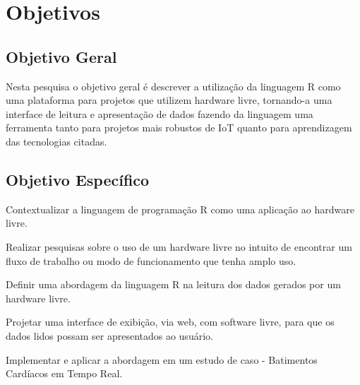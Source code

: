 \section[Objetivos]{Objetivos}


\subsection{Objetivo Geral}


Nesta pesquisa o objetivo geral é descrever a utilização da linguagem R como uma plataforma para projetos que utilizem hardware livre, tornando-a uma interface de leitura e apresentação de dados fazendo da linguagem uma ferramenta tanto para projetos mais robustos de IoT quanto para aprendizagem das tecnologias citadas.

\subsection{Objetivo Específico}

\begin{alineas}
  
    \item Contextualizar a linguagem de programação R como uma aplicação ao hardware livre. 
    \item Realizar pesquisas sobre o uso de um hardware livre no intuito de encontrar um fluxo de trabalho ou modo de funcionamento que tenha amplo uso.
    \item Definir uma abordagem da linguagem R na leitura dos dados gerados por um hardware livre.
    \item Projetar uma interface de exibição, via web, com software livre, para que os dados lidos possam ser apresentados ao usuário.
    \item Implementar e aplicar a abordagem em um estudo de caso - Batimentos Cardíacos em Tempo Real.
\end{alineas}